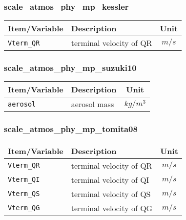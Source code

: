 \subsubsection{scale\_atmos\_phy\_mp\_kessler}
 \begin{tabularx}{150mm}{|l|X|c|} \hline
 \rowcolor[gray]{0.9} Item/Variable & Description  & Unit \\\hline
  \verb|Vterm_QR| & terminal velocity of QR &  $m/s$  \\\hline
 \end{tabularx}

\subsubsection{scale\_atmos\_phy\_mp\_suzuki10}
 \begin{tabularx}{150mm}{|l|X|c|} \hline
 \rowcolor[gray]{0.9} Item/Variable & Description  & Unit \\\hline
  \verb|aerosol| & aerosol mass & $kg/m^3$ \\\hline
 \end{tabularx}

\subsubsection{scale\_atmos\_phy\_mp\_tomita08}
 \begin{tabularx}{150mm}{|l|X|c|} \hline
 \rowcolor[gray]{0.9} Item/Variable & Description  & Unit \\\hline
  \verb|Vterm_QR| & terminal velocity of QR & $m/s$ \\\hline
  \verb|Vterm_QI| & terminal velocity of QI & $m/s$ \\\hline
  \verb|Vterm_QS| & terminal velocity of QS & $m/s$ \\\hline
  \verb|Vterm_QG| & terminal velocity of QG & $m/s$ \\\hline
 \end{tabularx}

